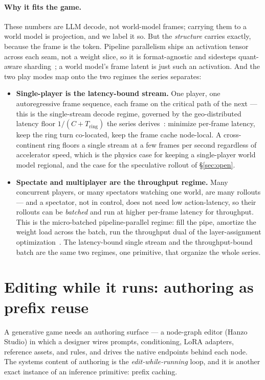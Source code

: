 \documentclass[11pt]{article}
\newcommand{\Tring}{\ensuremath{T_{\mathrm{ring}}}}
\begin{document}
\paragraph{Why it fits the game.} These numbers are LLM decode, not world-model frames; carrying them to a
world model is projection, and we label it so. But the \emph{structure} carries exactly, because the frame is
the token. Pipeline parallelism ships an activation tensor across each seam, not a weight slice, so it is
format-agnostic and sidesteps quant-aware sharding~\cite{openproblems}; a world model's frame latent is just
such an activation. And the two play modes map onto the two regimes the series separates:
\begin{itemize}[leftmargin=1.4em,itemsep=2pt]
\item \textbf{Single-player is the latency-bound stream.} One player, one autoregressive frame sequence, each
frame on the critical path of the next --- this is the single-stream decode regime, governed by the
geo-distributed latency floor $1/(C+\Tring)$ the series derives~\cite{latency}: minimize per-frame latency,
keep the ring turn co-located, keep the frame cache node-local. A cross-continent ring floors a single stream
at a few frames per second regardless of accelerator speed, which is the physics case for keeping a
single-player world model regional, and the case for the speculative rollout of \S\ref{sec:open}.
\item \textbf{Spectate and multiplayer are the throughput regime.} Many concurrent players, or many spectators
watching one world, are many rollouts --- and a spectator, not in control, does not need low action-latency, so
their rollouts can be \emph{batched} and run at higher per-frame latency for throughput. This is the
micro-batched pipeline-parallel regime: fill the pipe, amortize the weight load across the batch, run the
throughput dual of the layer-assignment optimization~\cite{openproblems}. The latency-bound single stream and
the throughput-bound batch are the same two regimes, one primitive, that organize the whole series.
\end{itemize}

\section{Editing while it runs: authoring as prefix reuse}
\label{sec:authoring}

A generative game needs an authoring surface --- a node-graph editor (Hanzo Studio) in which a designer wires
prompts, conditioning, LoRA adapters, reference assets, and rules, and drives the native endpoints behind each
node. The systems content of authoring is the \emph{edit-while-running} loop, and it is another exact instance
of an inference primitive: prefix caching.
\end{document}
